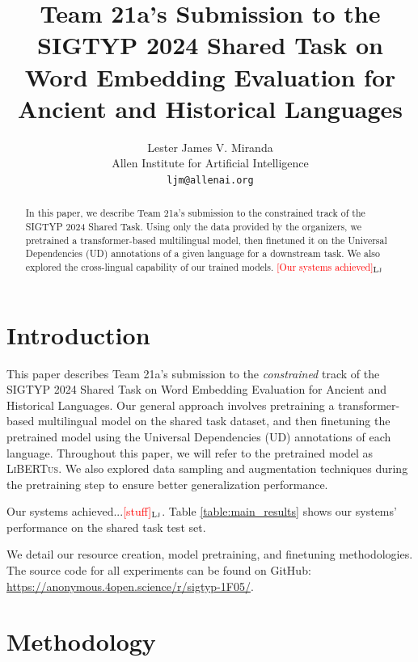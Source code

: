 \documentclass[11pt]{article}
\title{Team 21a's Submission to the SIGTYP 2024 Shared Task on Word Embedding Evaluation for Ancient and Historical Languages}
\author{Lester James V. Miranda \\
  Allen Institute for Artificial Intelligence \\
  \texttt{ljm@allenai.org} \\
}
\newcommand{\draftonly}[1]{#1}
\newcommand{\draftcomment}[3]{\draftonly{\textcolor{#2}{[#3]{$_{\textsc{#1}}$}}}}
\newcommand{\lj}[1]{\draftcomment{Lj}{red}{#1}}
\newcommand{\libertus}{\textsc{LiBERTus}}
\newcommand{\githuburl}{\url{https://anonymous.4open.science/r/sigtyp-1F05/}}
\begin{document}
\maketitle

\begin{abstract}
In this paper, we describe Team 21a's submission to the constrained track of the SIGTYP 2024 Shared Task.
Using only the data provided by the organizers, we pretrained a transformer-based multilingual model, then finetuned it on the Universal Dependencies (UD) annotations of a given language for a downstream task.
We also explored the cross-lingual capability of our trained models.
\lj{Our systems achieved}
\end{abstract}

\section{Introduction}
This paper describes Team 21a's submission to the \textit{constrained} track of the SIGTYP 2024 Shared Task on Word Embedding Evaluation for Ancient and Historical Languages.
Our general approach involves pretraining a transformer-based multilingual model on the shared task dataset, and then finetuning the pretrained model using the Universal Dependencies (UD) annotations of each language.
Throughout this paper, we will refer to the pretrained model as \libertus{}.
We also explored data sampling and augmentation techniques during the pretraining step to ensure better generalization performance.

Our systems achieved...\lj{stuff}. 
Table \ref{table:main_results} shows our systems' performance on the shared task test set.


We detail our resource creation, model pretraining, and finetuning methodologies.
The source code for all experiments can be found on GitHub: \githuburl{}.



\section{Methodology}

\end{document}
